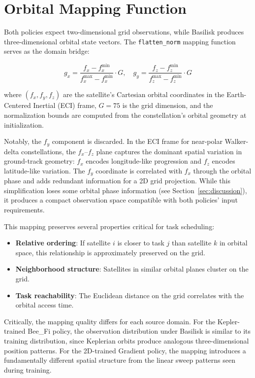 \documentclass[conference]{IEEEtran}
\begin{document}
\section{Orbital Mapping Function}
\label{sec:mapping}

Both policies expect two-dimensional grid observations, while Basilisk produces three-dimensional orbital state vectors. The \texttt{flatten\_norm} mapping function serves as the domain bridge:

\begin{equation}
    g_x = \frac{f_x - f_x^{\min}}{f_x^{\max} - f_x^{\min}} \cdot G, \quad
    g_y = \frac{f_z - f_z^{\min}}{f_z^{\max} - f_z^{\min}} \cdot G
    \label{eq:flatten_norm}
\end{equation}

\noindent where $(f_x, f_y, f_z)$ are the satellite's Cartesian orbital coordinates in the Earth-Centered Inertial (ECI) frame, $G = 75$ is the grid dimension, and the normalization bounds are computed from the constellation's orbital geometry at initialization.

Notably, the $f_y$ component is discarded. In the ECI frame for near-polar Walker-delta constellations, the $f_x$--$f_z$ plane captures the dominant spatial variation in ground-track geometry: $f_x$ encodes longitude-like progression and $f_z$ encodes latitude-like variation. The $f_y$ coordinate is correlated with $f_x$ through the orbital phase and adds redundant information for a 2D grid projection. While this simplification loses some orbital phase information (see Section~\ref{sec:discussion}), it produces a compact observation space compatible with both policies' input requirements.

This mapping preserves several properties critical for task scheduling:
\begin{itemize}
    \item \textbf{Relative ordering}: If satellite $i$ is closer to task $j$ than satellite $k$ in orbital space, this relationship is approximately preserved on the grid.
    \item \textbf{Neighborhood structure}: Satellites in similar orbital planes cluster on the grid.
    \item \textbf{Task reachability}: The Euclidean distance on the grid correlates with the orbital access time.
\end{itemize}

Critically, the mapping quality differs for each source domain. For the Kepler-trained Bee\_Fi policy, the observation distribution under Basilisk is similar to its training distribution, since Keplerian orbits produce analogous three-dimensional position patterns. For the 2D-trained Gradient policy, the mapping introduces a fundamentally different spatial structure from the linear sweep patterns seen during training.
\end{document}
